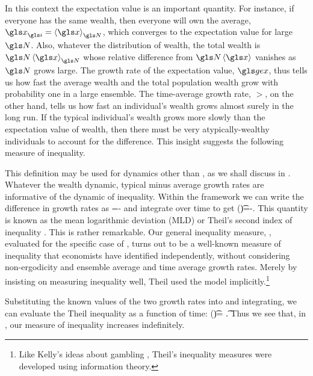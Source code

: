 In this context the expectation value is an important quantity. 
For instance, if everyone has the same wealth, then everyone will own the average, $\x_\gi=\ave{\x}_\N$, which converges to the expectation value for large $\N$. Also, whatever the distribution 
of wealth, the total wealth is $\N\ave{\x}_\N$ whose relative difference from $\N\ave{\x}$ vanishes as $\N$ grows large. The growth 
rate of the expectation value, $\gex$, thus tells us how fast the average wealth and the 
total population wealth grow with probability one in a large ensemble. The time-average growth rate, $\gt$, on the other hand, tells us how fast an individual's wealth grows almost surely in 
the long run. If the typical individual's wealth grows more slowly than the 
expectation value of wealth, then there must be very atypically-wealthy individuals 
to account for the difference. This insight suggests the following measure of 
inequality.


This definition may be used for dynamics other than
\GBM, as we shall discuss in . Whatever the wealth dynamic, typical minus average growth rates are informative of the
dynamic of inequality. Within the \GBM framework we can write the difference in growth rates as 
\be
\frac{\gd \J}{\gd\t}=\frac{\gd \ln \ave{\x}}{\gd\t}-\frac{\gd \ave{\ln \x}}{\gd\t}
\ee
and integrate over time to get
\be
\J(\t)=\ln \ave{\x(\t)}-\ave{\ln \x(\t)}.
\ee
This quantity is known as the mean logarithmic deviation (MLD) or Theil's second index of inequality \cite{Theil1967}. 
This is rather remarkable. Our general inequality measure, , evaluated 
for the specific case of \GBM, turns out to be a well-known measure of inequality that 
economists have identified independently, without considering non-ergodicity and ensemble 
average and time average growth rates. Merely by insisting on measuring inequality well,
Theil used the \GBM model implicitly.\footnote{Like Kelly's ideas about gambling \cite{Kelly1956}, Theil's inequality measures were developed using information theory.}

Substituting the known values of the two growth rates into  and integrating, we can evaluate the Theil inequality as a function of time:
\be
\J(\t)= \t.
\ee
Thus we see that, in \GBM, our measure of inequality increases indefinitely.

